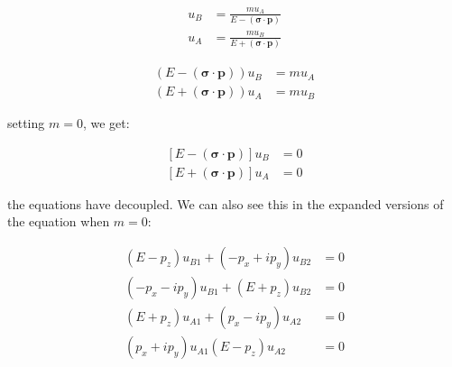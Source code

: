 \documentclass[11pt]{article}
\theoremstyle{definition}
\begin{document}
\begin{align}
    u_B &= \frac{m u_A}{E-\mathbf{(\sigma \cdot p)}}\\
    u_A &= \frac{m u_B}{E + \mathbf{(\sigma \cdot p)}}
\end{align}

\begin{align}
    (E-\mathbf{(\sigma \cdot p)})u_B &= m u_A\\
    (E + \mathbf{(\sigma \cdot p)})u_A &= m u_B
\end{align}

setting $m=0$, we get:

\begin{equation}
    \boxed{
    \begin{aligned}
        [E-\mathbf{(\sigma \cdot p)}] u_B &= 0\\
        [E + \mathbf{(\sigma \cdot p)}]u_A &= 0
    \end{aligned}
    }
 \end{equation}

 the equations have decoupled. We can also see this in the expanded versions of the equation when $m=0$:

 \begin{align}
    (E-p_z)u_{B1} + (-p_x+ip_y)u_{B2} &= 0\\
   (-p_x-ip_y)u_{B1} + (E + p_z) u_{B2} &= 0\\
    (E+p_z)u_{A1} + (p_x-ip_y)u_{A2} &= 0\\
    (p_x+ip_y)u_{A1} (E-p_z)u_{A2} &= 0
\end{align}


\newpage









\end{document}

